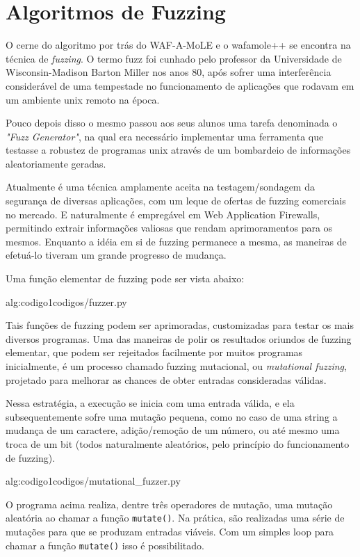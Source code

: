 \section{Algoritmos de Fuzzing}

O cerne do algoritmo por trás do WAF-A-MoLE e o wafamole++ se encontra na técnica de \textit{fuzzing}. O termo fuzz foi cunhado pelo professor da Universidade de Wisconsin-Madison Barton Miller nos anos 80, após sofrer uma interferência considerável de uma tempestade no funcionamento de aplicações que rodavam em um ambiente unix remoto na época. 

Pouco depois disso o mesmo passou aos seus alunos uma tarefa denominada o \textit{"Fuzz Generator"}, na qual era necessário implementar uma ferramenta que testasse a robustez de programas unix através de um bombardeio de informações aleatoriamente geradas.

Atualmente é uma técnica amplamente aceita na testagem/sondagem da segurança de diversas aplicações, com um leque de ofertas de fuzzing comerciais no mercado. E naturalmente é empregável em Web Application Firewalls, permitindo extrair informações valiosas que rendam aprimoramentos para os mesmos. Enquanto a idéia em si de fuzzing permanece a mesma, as maneiras de efetuá-lo tiveram um grande progresso de mudança.


Uma função elementar de fuzzing pode ser vista abaixo:

 {alg:codigo1}{codigos/fuzzer.py}

\bigskip
Tais funções de fuzzing podem ser aprimoradas, customizadas para testar os mais diversos programas. Uma das maneiras de polir os resultados oriundos de fuzzing elementar, que podem ser rejeitados facilmente por muitos programas inicialmente, é um processo chamado fuzzing mutacional, ou \textit{mutational fuzzing}, projetado para melhorar as chances de obter entradas consideradas válidas.

Nessa estratégia, a execução se inicia com uma entrada válida, e ela subsequentemente sofre uma mutação pequena, como no caso de uma string a mudança de um caractere, adição/remoção de um número, ou até mesmo uma troca de um bit (todos naturalmente aleatórios, pelo princípio do funcionamento de fuzzing).

 {alg:codigo1}{codigos/mutational_fuzzer.py}

\bigskip
O programa acima realiza, dentre três operadores de mutação, uma mutação aleatória ao chamar a função \verb+mutate()+. Na prática, são realizadas uma série de mutações para que se produzam entradas viáveis. Com um simples loop para chamar a função \verb+mutate()+ isso é possibilitado.


